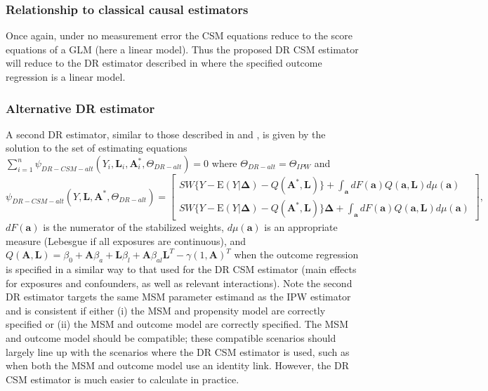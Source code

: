 \documentclass[12pt]{article}
\begin{document}
\subsubsection{Relationship to classical causal estimators}

Once again, under no measurement error the CSM equations reduce to the score equations of a GLM (here a linear model). Thus the proposed DR CSM estimator will reduce to the DR estimator described in \citet{kang2007} where the specified outcome regression is a linear model.

\subsubsection{Alternative DR estimator}

A second DR estimator, similar to those described in \citet{robins2000b} and \citet{neugebauer2005}, is given by the solution to the set of estimating equations \newline $\sum_{i=1}^{n} \psi_{DR-CSM-alt}(Y_{i}, \bm{L}_{i}, \bm{A}^{*}_{i}, \Theta_{DR-alt}) = 0$ where $\Theta_{DR-alt} = \Theta_{IPW}$ and
\footnotesize
\begin{equation*}
    \psi_{DR-CSM-alt}(Y, \bm{L}, \bm{A}^{*}, \Theta_{DR-alt}) =
    \begin{bmatrix}
       SW \{ Y - \text{E}(Y | \bm{\Delta}) - Q(\bm{A}^{*}, \bm{L}) \} + \int_{\bm{a}} dF(\bm{a})Q(\bm{a}, \bm{L})d\mu (\bm{a}) \\
       SW \{ Y - \text{E}(Y | \bm{\Delta}) - Q(\bm{A}^{*}, \bm{L}) \} \bm{\Delta} + \int_{\bm{a}} dF(\bm{a})Q(\bm{a}, \bm{L})d\mu (\bm{a})
    \end{bmatrix},
\end{equation*}
\normalsize
$dF(\bm{a})$ is the numerator of the stabilized weights, $d\mu (\bm{a})$ is an appropriate measure (Lebesgue if all exposures are continuous), and $Q(\bm{A}, \bm{L}) = \beta_{0} + \bm{A} \beta_{a} + \bm{L} \beta_{l} + \bm{A} \beta_{al}\bm{L}^{T} - \gamma (1, \bm{A})^{T}$ when the outcome regression is specified in a similar way to that used for the DR CSM estimator (main effects for exposures and confounders, as well as relevant interactions). Note the second DR estimator targets the same MSM parameter estimand as the IPW estimator and is consistent if either (i) the MSM and propensity model are correctly specified or (ii) the MSM and outcome model are correctly specified. The MSM and outcome model should be compatible; these compatible scenarios should largely line up with the scenarios where the DR CSM estimator is used, such as when both the MSM and outcome model use an identity link. However, the DR CSM estimator is much easier to calculate in practice.
\end{document}
